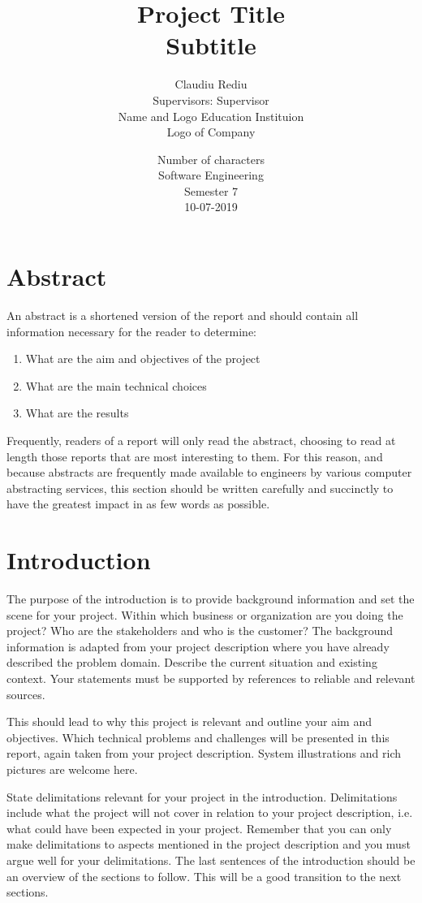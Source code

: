 \documentclass{article}
\title{\Huge Project Title \\ \Large Subtitle}
\date{Number of characters\\ Software Engineering \\ Semester 7 \\ 10-07-2019}
\author{Claudiu Rediu \\ Supervisors: Supervisor\\ Name and Logo Education Instituion \\ Logo of Company}
\begin{document}
	\maketitle
	\newpage
	\tableofcontents
	\newpage
	\section*{Abstract}
	An abstract is a shortened version of the report and should contain all information necessary for the reader to determine:
	\begin{enumerate}
		\item What are the aim and objectives of the project
		\item What are the main technical choices
		\item What are the results
	\end{enumerate}
	Frequently, readers of a report will only read the abstract, choosing to read at length those reports that are most interesting to them. For this reason, and because abstracts are frequently made available to engineers by various computer abstracting services, this section should be written carefully and succinctly to have the greatest impact in as few words as possible.
	\newpage
	\section{Introduction}
	The purpose of the introduction is to provide background information and set the scene for your project. Within which business or organization are you doing the project? Who are the stakeholders and who is the customer?
	The background information is adapted from your project description where you have already described the problem domain. Describe the current situation and existing context. Your statements must be supported by references to reliable and relevant sources. 
	
	This should lead to why this project is relevant and outline your aim and objectives. Which technical problems and challenges will be presented in this report, again taken from your project description. System illustrations and rich pictures are welcome here.
	
	State delimitations relevant for your project in the introduction. Delimitations include what the project will not cover in relation to your project description, i.e. what could have been expected in your project. Remember that you can only make delimitations to aspects mentioned in the project description and you must argue well for your delimitations.
	The last sentences of the introduction should be an overview of the sections to follow. This will be a good transition to the next sections.
	
\end{document}
